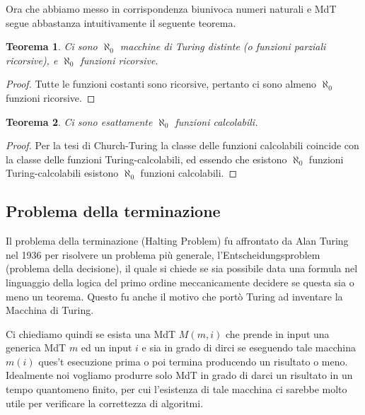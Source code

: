 \documentclass[a4paper,titlepage]{article}
\newtheorem{theorem}{Teorema}[section]
\theoremstyle{definition}
\begin{document}
Ora che abbiamo messo in corrispondenza biunivoca numeri naturali e MdT segue abbastanza intuitivamente il seguente teorema. 
\begin{theorem}
	Ci sono $\aleph_0$ macchine di Turing distinte (o funzioni parziali ricorsive), e $\aleph_0$ funzioni ricorsive. 
\end{theorem}
\begin{proof}
	Tutte le funzioni costanti sono ricorsive, pertanto ci sono almeno $\aleph_0$ funzioni ricorsive.
\end{proof}

\begin{theorem}
	Ci sono esattamente $\aleph_0$ funzioni calcolabili. 
\end{theorem}
\begin{proof}
	Per la tesi di Church-Turing la classe delle funzioni calcolabili coincide con la classe delle funzioni Turing-calcolabili, ed essendo che esistono $\aleph_0$ funzioni Turing-calcolabili esistono $\aleph_0$ funzioni calcolabili. 
\end{proof}

\subsection{Problema della terminazione}
Il problema della terminazione (Halting Problem) fu affrontato da Alan Turing nel 1936 per risolvere un problema più generale, l'Entscheidungsproblem (problema della decisione), il quale si chiede se sia possibile data una formula nel linguaggio della logica del primo ordine meccanicamente decidere se questa sia o meno un teorema. Questo fu anche il motivo che portò Turing ad inventare la Macchina di Turing. 

Ci chiediamo quindi se esista una MdT $M(m,i)$ che prende in input una generica MdT $m$ ed un input $i$ e sia in grado di dirci se eseguendo tale macchina $m(i)$ ques't esecuzione prima o poi termina producendo un risultato o meno. Idealmente noi vogliamo produrre solo MdT in grado di darci un risultato in un tempo quantomeno finito, per cui l'esistenza di tale macchina ci sarebbe molto utile per verificare la correttezza di algoritmi. 
\end{document}
